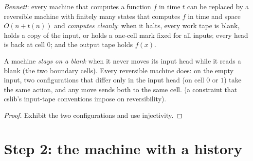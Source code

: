\begin{definition}
  \label{def:bennett}
  \leanok
  \emph{Bennett}: every machine that computes a function $f$ in time $t$ can be replaced by a
  reversible machine with finitely many states that computes $f$ in time and space $O(n + t(n))$ and
  \emph{computes cleanly}: when it halts, every work tape is blank, holds a copy of the input, or holds a
  one-cell mark fixed for all inputs; every head is back at cell $0$; and the output tape holds $f(x)$.
\end{definition}

\begin{lemma}
  \label{lem:staysOnBlank}
  \leanok
  A machine \emph{stays on a blank} when it never moves its input head while it reads a blank (the
  two boundary cells). Every reversible machine does: on the empty input, two configurations that
  differ only in the input head (on cell $0$ or $1$) take the same action, and any move sends both
  to the same cell.
  \own{} (a constraint that cslib's input-tape conventions impose on reversibility).
\end{lemma}

\begin{proof}
  \leanok
  Exhibit the two configurations and use injectivity.
\end{proof}

\section{Step 2: the machine with a history}

